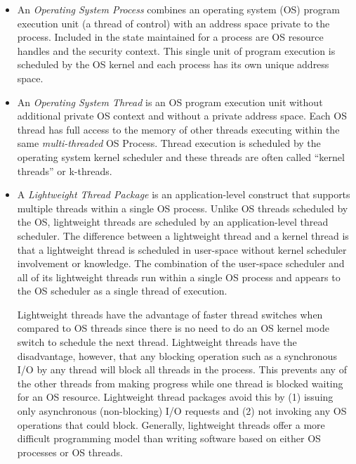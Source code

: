 \documentclass[b5paper,11pt,twoside,openright]{book}
\begin{document}
\begin{itemize}

\item
  An \emph{Operating System Process} combines an operating system (OS)
  program execution unit (a thread of control) with an address space private to the process. Included in the state maintained
for a process are OS resource handles and the security context. This
single unit of program execution is scheduled by the OS kernel and each
process has its own unique address space.
\item
  An \emph{Operating System Thread} is an OS program execution unit
  without additional private OS context and without a private address
  space. Each OS thread has full access to the memory of other threads
  executing within the same \emph{multi-threaded} OS Process. Thread
  execution is scheduled by the operating system kernel scheduler and
  these threads are often called ``kernel threads'' or k-threads.
\item
  A \emph{Lightweight Thread Package} is an application-level construct
  that supports multiple threads within a single OS process. Unlike OS
  threads scheduled by the OS, lightweight threads are scheduled by an
  application-level thread scheduler. The difference between a
  lightweight thread and a kernel thread is that a lightweight thread is
  scheduled in user-space without kernel scheduler involvement or
  knowledge. The combination of the user-space scheduler and all of its
  lightweight threads run within a single OS process and appears to the
  OS scheduler as a single thread of execution.

Lightweight threads have the advantage of faster thread switches when
compared to OS threads since there is no need to do an OS kernel mode
switch to schedule the next thread. Lightweight threads have the
disadvantage, however, that any blocking operation such as a
synchronous I/O by any thread will block all threads in the process.
This prevents any of the other threads from making progress while one
thread is blocked waiting for an OS resource. Lightweight thread
packages avoid this by (1) issuing only asynchronous (non-blocking) I/O
requests and (2) not invoking any OS operations that could block.
Generally, lightweight threads offer a more difficult programming model
than writing software based on either OS processes or OS threads.


\end{itemize}
\end{document}
